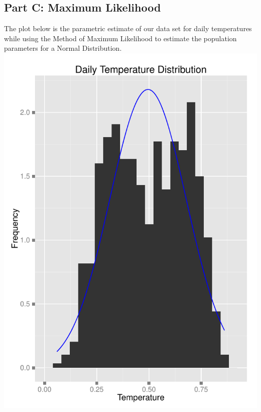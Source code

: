 \documentclass[11pt]{article}
\begin{document}
\subsection{Part C: Maximum Likelihood}
\label{subsesc:problem3cmaximumlikelihood}
The plot below is the parametric estimate of our data set for daily temperatures while using the Method of Maximum Likelihood to estimate the population parameters for a Normal Distribution. 
\newline
\includegraphics{Problem3CMLE.pdf}
\newline
\pagebreak
\end{document}
